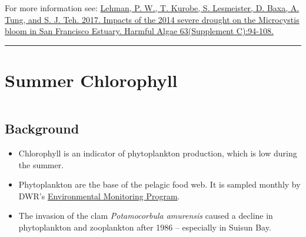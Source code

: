\documentclass[
]{book}
\providecommand{\tightlist}{%
  \setlength{\itemsep}{0pt}\setlength{\parskip}{0pt}}
\begin{document}
\begin{disclaimer}
For more information see:
\href{https://www.sciencedirect.com/science/article/pii/S1568988316302177}{Lehman,
P. W., T. Kurobe, S. Lesmeister, D. Baxa, A. Tung, and S. J. Teh. 2017.
Impacts of the 2014 severe drought on the Microcystis bloom in San
Francisco Estuary. Harmful Algae 63(Supplement C):94-108.}
\end{disclaimer}

\begin{center}\rule{0.5\linewidth}{0.5pt}\end{center}

\hypertarget{summer-chlorophyll}{%
\section{Summer Chlorophyll}\label{summer-chlorophyll}}

\begin{column}{0.7\textwidth}
\hypertarget{background-8}{%
\subsection{Background}\label{background-8}}

\begin{itemize}
\tightlist
\item
  Chlorophyll is an indicator of phytoplankton production, which is low during the summer.
\item
  Phytoplankton are the base of the pelagic food web. It is sampled monthly by DWR's \href{https://emp.baydeltalive.com/wiki/12297}{Environmental Monitoring Program}.
\item
  The invasion of the clam \emph{Potamocorbula amurensis} caused a decline in phytoplankton and zooplankton after 1986 -- especially in Suisun Bay.
\end{itemize}
\end{column}
\end{document}

